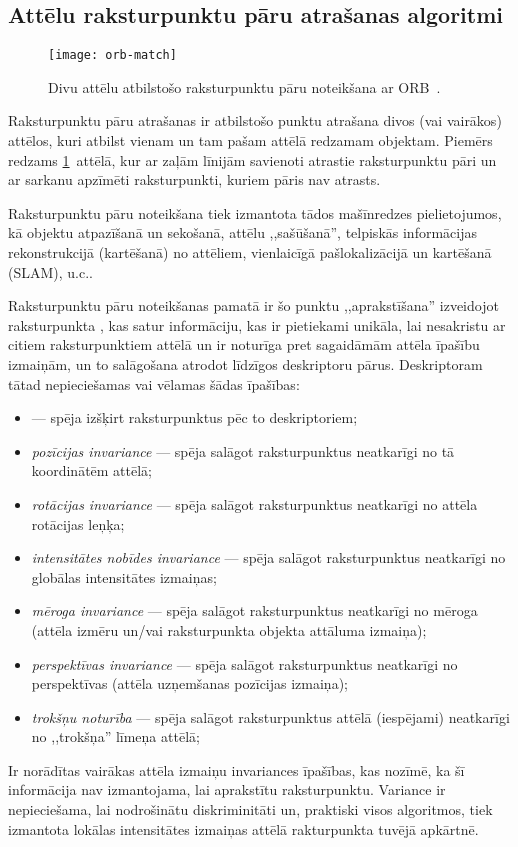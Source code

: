 \subsection{Attēlu raksturpunktu pāru atrašanas algoritmi} \label{sec:matching}
\begin{figure}[tbh]
	\centering
	\texttt{[image: orb-match]}
	\caption{Divu attēlu atbilstošo raksturpunktu pāru noteikšana ar ORB~\cite{ORB}.}
	\label{fig:orb}
\end{figure}

Raksturpunktu pāru atrašanas ir atbilstošo punktu atrašana divos
(vai vairākos) attēlos, kuri atbilst vienam un tam pašam attēlā redzamam
objektam. Piemērs redzams \ref{fig:orb}~attēlā, kur ar zaļām līnijām
savienoti atrastie raksturpunktu pāri un ar sarkanu apzīmēti raksturpunkti,
kuriem pāris nav atrasts.

Raksturpunktu pāru noteikšana tiek izmantota tādos mašīnredzes pielietojumos, kā
objektu atpazīšanā un sekošanā, attēlu ,,sašūšanā'', 
telpiskās informācijas rekonstrukcijā (kartēšanā) no attēliem,
vienlaicīgā pašlokalizācijā un kartēšanā (SLAM), u.c..

Raksturpunktu pāru noteikšanas pamatā ir šo punktu ,,aprakstīšana'' izveidojot
raksturpunkta , kas satur informāciju,
kas ir pietiekami unikāla, lai nesakristu ar citiem raksturpunktiem attēlā
un ir noturīga pret sagaidāmām attēla īpašību izmaiņām, un to salāgošana
atrodot līdzīgos deskriptoru pārus.
Deskriptoram tātad nepieciešamas vai vēlamas šādas īpašības:
\begin{itemize}
	\item {} --- spēja izšķirt raksturpunktus
		pēc to deskriptoriem;
	\item \emph{pozīcijas invariance} --- spēja salāgot raksturpunktus
		neatkarīgi no tā koordinātēm attēlā;
	\item \emph{rotācijas invariance} --- spēja salāgot raksturpunktus
		neatkarīgi no attēla rotācijas leņķa;
	\item \emph{intensitātes nobīdes invariance} --- spēja salāgot raksturpunktus
		neatkarīgi no globālas intensitātes izmaiņas;
	\item \emph{mēroga invariance} --- spēja salāgot raksturpunktus
		neatkarīgi no mēroga (attēla izmēru un/vai raksturpunkta objekta attāluma izmaiņa);
	\item \emph{perspektīvas invariance} --- spēja salāgot raksturpunktus
		neatkarīgi no perspektīvas (attēla uzņemšanas pozīcijas izmaiņa);
	\item \emph{trokšņu noturība} --- spēja salāgot raksturpunktus
		attēlā (iespējami) neatkarīgi no ,,trokšņa'' līmeņa attēlā;
\end{itemize}
Ir norādītas vairākas attēla izmaiņu invariances īpašības,
kas nozīmē, ka šī informācija nav izmantojama,
lai aprakstītu raksturpunktu.
Variance ir nepieciešama, lai nodrošinātu diskriminitāti un, praktiski visos
algoritmos, tiek izmantota lokālas intensitātes izmaiņas attēlā 
rakturpunkta tuvējā apkārtnē.


